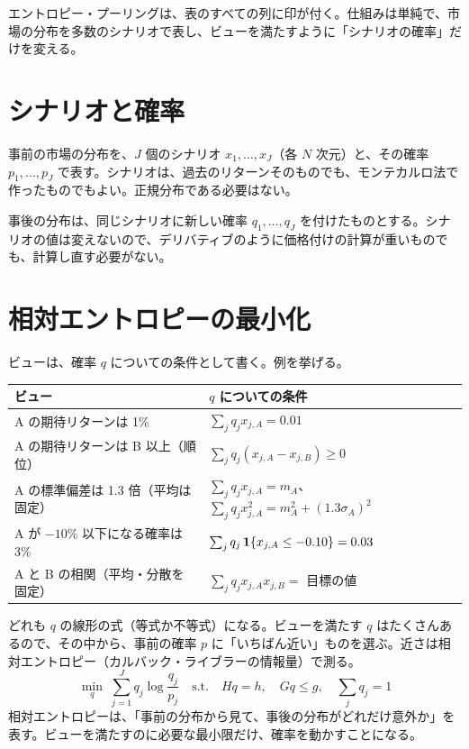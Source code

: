 エントロピー・プーリングは、表のすべての列に印が付く。仕組みは単純で、市場の分布を多数のシナリオで表し、ビューを満たすように「シナリオの確率」だけを変える。

\section{シナリオと確率}

事前の市場の分布を、$J$ 個のシナリオ $x_1,\dots,x_J$（各 $N$ 次元）と、その確率 $p_1,\dots,p_J$ で表す。シナリオは、過去のリターンそのものでも、モンテカルロ法で作ったものでもよい。正規分布である必要はない。

事後の分布は、同じシナリオに新しい確率 $q_1,\dots,q_J$ を付けたものとする。シナリオの値は変えないので、デリバティブのように価格付けの計算が重いものでも、計算し直す必要がない。

\section{相対エントロピーの最小化}

ビューは、確率 $q$ についての条件として書く。例を挙げる。

\begin{center}
\small
\begin{tabular}{p{4.4cm}p{9.2cm}}
\toprule
ビュー & $q$ についての条件 \\
\midrule
A の期待リターンは 1\% & $\sum_j q_j x_{j,A}=0.01$ \\
A の期待リターンは B 以上（順位） & $\sum_j q_j(x_{j,A}-x_{j,B})\ge0$ \\
A の標準偏差は 1.3 倍（平均は固定） & $\sum_j q_jx_{j,A}=m_A$、$\sum_j q_jx_{j,A}^2=m_A^2+(1.3\sigma_A)^2$ \\
A が $-10\%$ 以下になる確率は 3\% & $\sum_j q_j\,\mathbf{1}\{x_{j,A}\le-0.10\}=0.03$ \\
A と B の相関（平均・分散を固定） & $\sum_j q_jx_{j,A}x_{j,B}=$ 目標の値 \\
\bottomrule
\end{tabular}
\end{center}

どれも $q$ の線形の式（等式か不等式）になる。ビューを満たす $q$ はたくさんあるので、その中から、事前の確率 $p$ に「いちばん近い」ものを選ぶ。近さは相対エントロピー（カルバック・ライブラーの情報量）で測る。
\begin{equation}
\min_{q}\;\sum_{j=1}^J q_j\log\frac{q_j}{p_j}
\quad\text{s.t.}\quad Hq=h,\quad Gq\le g,\quad \sum_j q_j=1
\label{eq:ep}
\end{equation}
相対エントロピーは、「事前の分布から見て、事後の分布がどれだけ意外か」を表す。ビューを満たすのに必要な最小限だけ、確率を動かすことになる。

